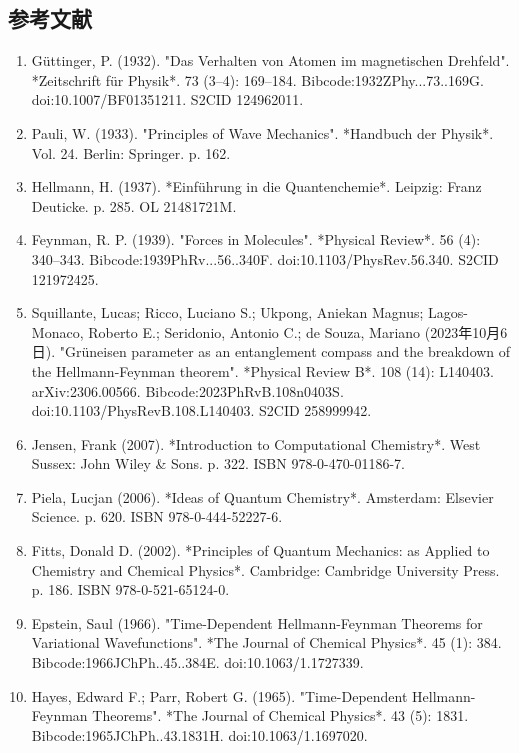 \subsection{参考文献}
\begin{enumerate}
\item Güttinger, P. (1932). "Das Verhalten von Atomen im magnetischen Drehfeld". *Zeitschrift für Physik*. 73 (3–4): 169–184. Bibcode:1932ZPhy...73..169G. doi:10.1007/BF01351211. S2CID 124962011.
\item Pauli, W. (1933). "Principles of Wave Mechanics". *Handbuch der Physik*. Vol. 24. Berlin: Springer. p. 162.
\item Hellmann, H. (1937). *Einführung in die Quantenchemie*. Leipzig: Franz Deuticke. p. 285. OL 21481721M.
\item Feynman, R. P. (1939). "Forces in Molecules". *Physical Review*. 56 (4): 340–343. Bibcode:1939PhRv...56..340F. doi:10.1103/PhysRev.56.340. S2CID 121972425.
\item Squillante, Lucas; Ricco, Luciano S.; Ukpong, Aniekan Magnus; Lagos-Monaco, Roberto E.; Seridonio, Antonio C.; de Souza, Mariano (2023年10月6日). "Grüneisen parameter as an entanglement compass and the breakdown of the Hellmann-Feynman theorem". *Physical Review B*. 108 (14): L140403. arXiv:2306.00566. Bibcode:2023PhRvB.108n0403S. doi:10.1103/PhysRevB.108.L140403. S2CID 258999942.
\item Jensen, Frank (2007). *Introduction to Computational Chemistry*. West Sussex: John Wiley & Sons. p. 322. ISBN 978-0-470-01186-7.
\item Piela, Lucjan (2006). *Ideas of Quantum Chemistry*. Amsterdam: Elsevier Science. p. 620. ISBN 978-0-444-52227-6.
\item Fitts, Donald D. (2002). *Principles of Quantum Mechanics: as Applied to Chemistry and Chemical Physics*. Cambridge: Cambridge University Press. p. 186. ISBN 978-0-521-65124-0.
\item Epstein, Saul (1966). "Time-Dependent Hellmann-Feynman Theorems for Variational Wavefunctions". *The Journal of Chemical Physics*. 45 (1): 384. Bibcode:1966JChPh..45..384E. doi:10.1063/1.1727339.
\item Hayes, Edward F.; Parr, Robert G. (1965). "Time-Dependent Hellmann-Feynman Theorems". *The Journal of Chemical Physics*. 43 (5): 1831. Bibcode:1965JChPh..43.1831H. doi:10.1063/1.1697020.
\end{enumerate}